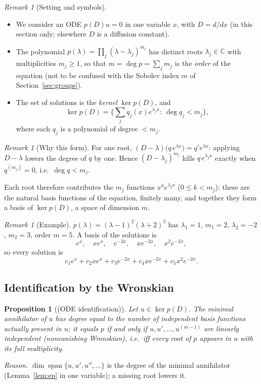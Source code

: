 \documentclass[11pt]{article}
\theoremstyle{plain}
\newtheorem{proposition}[theorem]{Proposition}
\theoremstyle{definition}
\theoremstyle{remark}
\newtheorem{remark}[theorem]{Remark}
\newcommand{\C}{\mathbb{C}}
\DeclareMathOperator{\spn}{span}
\DeclareMathOperator{\dimc}{dim}
\newenvironment{aside}[1]{\begin{remark}[#1]}{\end{remark}}
\newenvironment{notebox}[1]{\begin{remark}[#1]}{\end{remark}}
\begin{document}
\begin{notebox}{Setting and symbols}
\begin{itemize}[nosep]
\item We consider an ODE $p(D)u=0$ in one variable $x$, with $D=d/dx$ (in this section only; elsewhere $D$ is a diffusion constant).
\item The polynomial $p(\lambda)=\prod_j(\lambda-\lambda_j)^{m_j}$ has distinct roots $\lambda_j\in\C$ with multiplicities $m_j\ge1$, so that $m=\deg p=\sum_jm_j$ is the \emph{order} of the equation (not to be confused with the Sobolev index $m$ of Section~\ref{sec:groups}).
\item The set of solutions is the \emph{kernel} $\ker p(D)$, and
\[
\ker p(D)=\Big\{\sum_jq_j(x)e^{\lambda_jx}:\ \deg q_j<m_j\Big\},
\]
where each $q_j$ is a polynomial of degree $<m_j$.
\end{itemize}
\end{notebox}

\begin{aside}{Why this form}
For one root, $(D-\lambda)\big(q\,e^{\lambda x}\big)=q'e^{\lambda x}$: applying $D-\lambda$ lowers the degree of $q$ by one. Hence $(D-\lambda_j)^{m_j}$ kills $q\,e^{\lambda_jx}$ exactly when $q^{(m_j)}=0$, i.e.\ $\deg q<m_j$.

Each root therefore contributes the $m_j$ functions $x^ke^{\lambda_jx}$ ($0\le k<m_j$): these are the natural basis functions of the equation, finitely many, and together they form a basis of $\ker p(D)$, a space of dimension $m$.
\end{aside}

\begin{aside}{Example}
$p(\lambda)=(\lambda-1)^2(\lambda+2)^3$ has $\lambda_1=1$, $m_1=2$, $\lambda_2=-2$, $m_2=3$, order $m=5$. A basis of the solutions is
\[
e^{x},\quad xe^{x},\quad e^{-2x},\quad xe^{-2x},\quad x^2e^{-2x},
\]
so every solution is
\[
c_1e^{x}+c_2xe^{x}+c_3e^{-2x}+c_4xe^{-2x}+c_5x^2e^{-2x}.
\]
\end{aside}

\subsection{Identification by the Wronskian}
\begin{proposition}[{(ODE identification)}]
Let $u\in\ker p(D)$. The minimal annihilator of $u$ has degree equal to the number of independent basis functions actually present in $u$; it equals $p$ if and only if $u,u',\dots,u^{(m-1)}$ are linearly independent (nonvanishing Wronskian), i.e.\ iff every root of $p$ appears in $u$ with its full multiplicity.
\end{proposition}
\emph{Reason.} $\dimc\spn\{u,u',u'',\dots\}$ is the degree of the minimal annihilator (Lemma~\ref{lem:ep} in one variable); a missing root lowers it.
\end{document}
